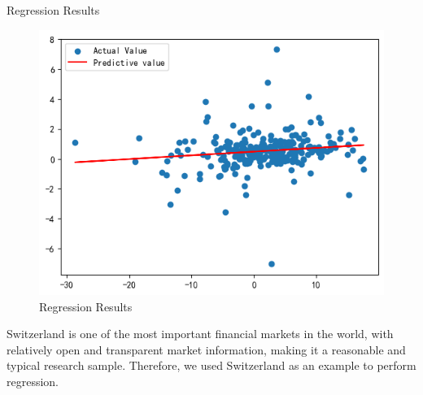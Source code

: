 \documentclass[10pt]{beamer}
\begin{document}
\begin{frame}{Regression Results}

    \begin{figure}[htp]
    \centering
    \includegraphics[scale=0.5]{"EA2"}
    \caption{Regression Results}
    \label{regression}
    \end{figure}
    
    Switzerland is one of the most important financial markets in the world, with relatively open and transparent market information, making it a reasonable and typical research sample. Therefore, we used Switzerland as an example to perform regression.
\end{frame}
\end{document}
